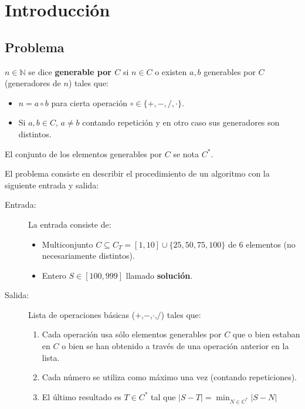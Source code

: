 \section{Introducción}
\subsection{Problema}

\begin{definition}
	$n \in \mathbb{N}$ se dice \textbf{generable por $C$} si $n \in C$ o
	existen $a,b$ generables por $C$ (generadores de $n$) tales que:
	\begin{itemize}
		\item $n = a \circ b$ para cierta operación $\circ \in \{+,-,/,\cdot \}$.
		\item Si $a,b \in C$, $a \neq b$ contando repetición y en otro caso sus
		generadores son distintos.
	\end{itemize}
	El conjunto de los elementos generables por $C$ se nota $C^{\ast}$.
\end{definition}

El problema consiste en describir el procedimiento de un algoritmo con la
siguiente entrada y salida:

\begin{description}
	\item[Entrada:] La entrada consiste de:
		\begin{itemize}
			\item Multiconjunto $C \subseteq C_T = [1,10] \cup \{ 25, 50, 75, 100\}$
			de 6 elementos (no necesariamente distintos).
			\item Entero $S \in [100, 999]$ llamado \textbf{solución}.
		\end{itemize}

	\item[Salida:] Lista de operaciones básicas ($+$,$-$,$\cdot$,$/$) tales que:
	\begin{enumerate}
		\item Cada operación usa sólo elementos generables por $C$ que o bien estaban en $C$ o bien se han obtenido a través de una operación anterior en la lista.
		\item Cada número se utiliza como máximo una vez (contando repeticiones).
		\item El último resultado es $T \in C^{\ast}$ tal que $|S-T| = \displaystyle \min_{N \in C^{\ast}} |S-N|$
	\end{enumerate}
\end{description}

